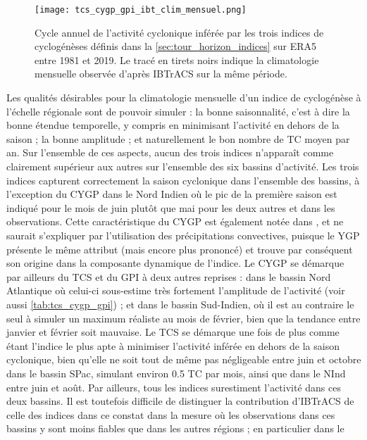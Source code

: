 \documentclass[../main.tex]{subfiles}
\begin{document}
\begin{figure}[tb]
    \centering
    \texttt{[image: tcs\_cygp\_gpi\_ibt\_clim\_mensuel.png]}
    \caption{Cycle annuel de l'activité cyclonique inférée par les trois indices de cyclogénèses définis dans la \cref{sec:tour_horizon_indices} sur
    ERA5 entre 1981 et 2019. Le tracé en tirets noirs indique la climatologie mensuelle observée d'après IBTrACS sur la même période.}
    \label{fig:tcs_cygp_gpi_clim_mensuel}
\end{figure}

Les qualités désirables pour la climatologie mensuelle d'un indice de cyclogénèse à l'échelle régionale sont de pouvoir simuler : la bonne saisonnalité, c'est à
dire la bonne étendue temporelle, y compris en minimisant l'activité en dehors de la saison ; la bonne amplitude ; et naturellement le bon nombre de TC moyen
par an. Sur l'ensemble de ces aspects, aucun des trois indices n'apparaît comme clairement supérieur aux autres sur l'ensemble des six bassins d'activité. Les
trois indices capturent correctement la saison cyclonique dans l'ensemble des bassins, à l'exception du CYGP dans le Nord Indien où le pic de la première saison est
indiqué pour le mois de juin plutôt que mai pour les deux autres et dans les observations. Cette caractéristique du CYGP est également notée dans
\textcite{menkes_comparison_2012}, et ne saurait s'expliquer par l'utilisation des précipitations convectives, puisque le YGP présente le même attribut (mais
encore plus prononcé) et trouve par conséquent son origine dans la composante dynamique de l'indice. Le CYGP se démarque par ailleurs du TCS et du GPI à deux
autres reprises : dans le bassin Nord Atlantique où celui-ci sous-estime très fortement l'amplitude de l'activité (voir aussi \cref{tab:tcs_cygp_gpi}) ; et dans
le bassin Sud-Indien, où il est au contraire le seul à simuler un maximum réaliste au mois de février, bien que la tendance entre janvier et février soit
mauvaise. Le TCS se démarque une fois de plus comme étant l'indice le plus apte à minimiser l'activité inférée en dehors de la saison cyclonique, bien
qu'elle ne soit tout de même pas négligeable entre juin et octobre dans le bassin SPac, simulant environ \num{0.5} TC par mois, ainsi que dans le NInd entre
juin et août. Par ailleurs, tous les indices surestiment l'activité dans ces deux bassins. Il est toutefois difficile de distinguer la contribution d'IBTrACS de
celle des indices dans ce constat dans la mesure où les observations dans ces bassins y sont moins fiables que dans les autres régions ; en particulier dans le
\end{document}
